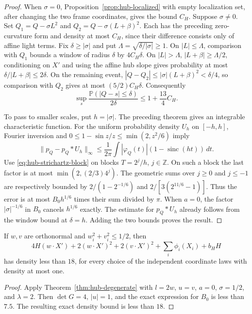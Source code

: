 \begin{proof}
When $\sigma=0$, Proposition~\ref{prop:hub-localized} with empty
localization set, after changing the two frame coordinates,
gives the bound $C_H$.  Suppose $\sigma\ne0$.
Set $Q_1=Q-\sigma L^2$ and
$Q_2=Q-\sigma(L+\beta)^2$.
Each has the preceding zero-curvature form and density at most
$C_H$, since their difference consists only of affine light terms.
Fix $\delta\ge|\sigma|$ and put
$\Lambda=\sqrt{\delta/|\sigma|}\ge1$.
On $|L|\le\Lambda$, comparison with $Q_1$ bounds a window of
radius $\delta$ by $4C_H\delta$.
On $|L|>\Lambda$, $|L+\beta|\ge\Lambda/2$, conditioning on
$X'$ and using the affine hub slope gives probability at most
$\delta/|L+\beta|\le2\delta$.
On the remaining event,
$|Q-Q_2|\le|\sigma|(L+\beta)^2<\delta/4$,
so comparison with $Q_2$ gives at most $(5/2)C_H\delta$.
Consequently
\[
 \sup_s\frac{\mathbb P(|Q-s|\le\delta)}{2\delta}
 \le1+\frac{13}{4}C_H.
\]

To pass to smaller scales, put $h=|\sigma|$.
The preceding theorem gives an integrable characteristic function.
For the uniform probability density $U_h$ on $[-h,h]$,
Fourier inversion and $0\le1-\sin z/z\le\min(2,z^2/6)$ imply
\[
 \|p_Q-p_Q*U_h\|_\infty
 \le\frac1{2\pi}\int |\varphi_Q(t)|
                       (1-\operatorname{sinc}(ht))\,dt.
\]
Use \eqref{eq:hub-strichartz-block} on blocks
$T=2^j/h$, $j\in\mathbb Z$.
On such a block the last factor is at most
$\min(2,(2/3)4^j)$.  The geometric sums over $j\ge0$ and
$j\le-1$ are respectively bounded by
$2/(1-2^{-1/6})$ and $2/[3(2^{11/6}-1)]$.
Thus the error is at most
$B_0h^{1/6}$ times their sum divided by $\pi$.
When $a=0$, the factor $|\sigma|^{-1/6}$ in $B_0$
cancels $h^{1/6}$ exactly.  The estimate for $p_Q*U_h$
already follows from the window bound at $\delta=h$.
Adding the two bounds proves the result.
\end{proof}

\begin{corollary}
\label{cor:hub-degenerate-normalized}
If $w,v$ are orthonormal and $w_i^2+v_i^2\le1/2$, then
\[
 4H(w\cdot X')+2(w\cdot X')^2+2(v\cdot X')^2
                         +\sum_i\phi_i(X_i)+b_HH
\]
has density less than $18$, for every choice of the independent
coordinate laws with density at most one.
\end{corollary}

\begin{proof}
Apply Theorem~\ref{thm:hub-degenerate} with $l=2w$, $u=v$,
$a=0$, $\sigma=1/2$, and $\lambda=2$.
Then $\det G=4$, $|u|=1$, and the exact expression for $B_0$
is less than $7.5$.  The resulting exact density bound is
less than $18$.
\end{proof}

